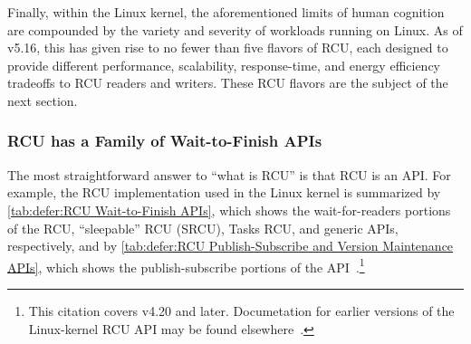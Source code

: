 Finally, within the Linux kernel, the aforementioned limits of human
cognition are compounded by the variety and severity of workloads running
on Linux.
As of v5.16, this has given rise to no fewer than five flavors of
RCU, each designed to provide different performance, scalability,
response-time, and energy efficiency tradeoffs to RCU readers and writers.
These RCU flavors are the subject of the next section.

\subsubsection{RCU has a Family of Wait-to-Finish APIs}
\label{sec:defer:RCU has a Family of Wait-to-Finish APIs}

The most straightforward answer to ``what is RCU'' is that RCU is
an API\@.
For example, the RCU implementation used in the Linux kernel is
summarized by
\cref{tab:defer:RCU Wait-to-Finish APIs},
which shows the wait-for-readers portions of the RCU, ``sleepable'' RCU
(SRCU), Tasks RCU, and generic APIs, respectively,
and by
\cref{tab:defer:RCU Publish-Subscribe and Version Maintenance APIs},
which shows the publish-subscribe portions of the
API~\cite{PaulEMcKenney2019RCUAPI}.\footnote{
	This citation covers v4.20 and later.
	Documetation for earlier versions of the Linux-kernel RCU API may
	be found elsewhere~\cite{PaulEMcKenney2008WhatIsRCUAPI,PaulEMcKenney2014RCUAPI}.}

